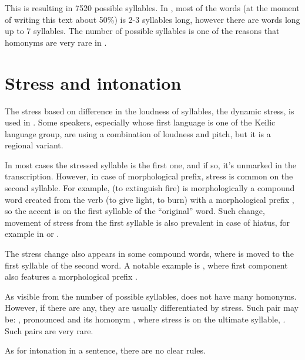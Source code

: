 This is resulting in 7520 possible syllables. In \andro, most of the words (at
the moment of writing this text about 50\%) is 2-3 syllables long, however there
are words long up to 7 syllables. The number of possible syllables is one of the
reasons that homonyms are very rare in \andro.

\section{Stress and intonation}

The stress based on difference in the loudness of syllables, the dynamic stress,
is used in \andro. Some speakers, especially whose first language is one of the
Keilic language group, are using a combination of loudness and pitch, but it is
a regional variant.

In most cases the stressed syllable is the first one, and if so, it's unmarked
in the transcription. However, in case of morphological prefix, stress is common
on the second syllable. For example,   (to
extinguish fire) is morphologically a compound word created from the verb
  (to give light, to burn) with a morphological prefix
, so the accent is on the first syllable of the ``original'' word. Such
change, movement of stress from the first syllable is also prevalent in case of
hiatus, for example in  or .

The stress change also appears in some compound words, where is moved to
the first syllable of the second word. A notable example is
 , where first component also
features a morphological prefix .

As visible from the number of possible syllables, \andro does not have many
homonyms. However, if there are any, they are usually differentiated by stress.
Such pair may be: , pronounced  and its homonym
, where stress is on the ultimate syllable, . Such
pairs are very rare.

As for intonation in a sentence, there are no clear rules.